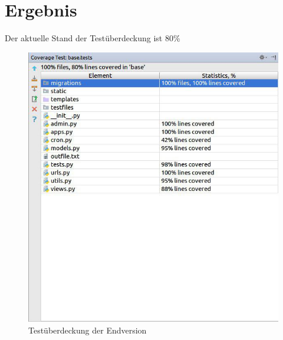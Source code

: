 \newpage
\section{Ergebnis}

Der aktuelle Stand der Testüberdeckung ist 80\%

\begin{figure}[H]
    \centering
    \includegraphics[width=15cm]{images/Coverage_white.jpg}
    \caption{Testüberdeckung der Endversion}
    \label{Ergebnis2}
\end{figure}
